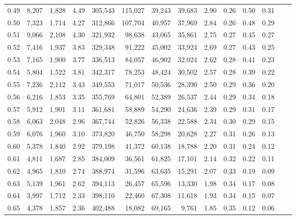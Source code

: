\begin{tabular}{rrrrrrrrrrrrrr}
0.49 &   8,207 &  1,828 &    4.49 &  305,543 &  115,027 &  39,243 &  39,683 &  2.90 &  0.26 &  0.50 &      0.31 \\
0.50 &   7,323 &  1,714 &    4.27 &  312,866 &  107,704 &  40,957 &  37,969 &  2.84 &  0.26 &  0.48 &      0.29 \\
0.51 &   9,066 &  2,108 &    4.30 &  321,932 &   98,638 &  43,065 &  35,861 &  2.75 &  0.27 &  0.45 &      0.27 \\
0.52 &   7,416 &  1,937 &    3.83 &  329,348 &   91,222 &  45,002 &  33,924 &  2.69 &  0.27 &  0.43 &      0.25 \\
0.53 &   7,165 &  1,900 &    3.77 &  336,513 &   84,057 &  46,902 &  32,024 &  2.62 &  0.28 &  0.41 &      0.23 \\
0.54 &   5,804 &  1,522 &    3.81 &  342,317 &   78,253 &  48,424 &  30,502 &  2.57 &  0.28 &  0.39 &      0.22 \\
0.55 &   7,236 &  2,112 &    3.43 &  349,553 &   71,017 &  50,536 &  28,390 &  2.50 &  0.29 &  0.36 &      0.20 \\
0.56 &   6,216 &  1,853 &    3.35 &  355,769 &   64,801 &  52,389 &  26,537 &  2.44 &  0.29 &  0.34 &      0.18 \\
0.57 &   5,912 &  1,901 &    3.11 &  361,681 &   58,889 &  54,290 &  24,636 &  2.39 &  0.29 &  0.31 &      0.17 \\
0.58 &   6,063 &  2,048 &    2.96 &  367,744 &   52,826 &  56,338 &  22,588 &  2.34 &  0.30 &  0.29 &      0.15 \\
0.59 &   6,076 &  1,960 &    3.10 &  373,820 &   46,750 &  58,298 &  20,628 &  2.27 &  0.31 &  0.26 &      0.13 \\
0.60 &   5,378 &  1,840 &    2.92 &  379,198 &   41,372 &  60,138 &  18,788 &  2.20 &  0.31 &  0.24 &      0.12 \\
0.61 &   4,811 &  1,687 &    2.85 &  384,009 &   36,561 &  61,825 &  17,101 &  2.14 &  0.32 &  0.22 &      0.11 \\
0.62 &   4,965 &  1,810 &    2.74 &  388,974 &   31,596 &  63,635 &  15,291 &  2.07 &  0.33 &  0.19 &      0.09 \\
0.63 &   5,139 &  1,961 &    2.62 &  394,113 &   26,457 &  65,596 &  13,330 &  1.98 &  0.34 &  0.17 &      0.08 \\
0.64 &   3,997 &  1,712 &    2.33 &  398,110 &   22,460 &  67,308 &  11,618 &  1.93 &  0.34 &  0.15 &      0.07 \\
0.65 &   4,378 &  1,857 &    2.36 &  402,488 &   18,082 &  69,165 &   9,761 &  1.85 &  0.35 &  0.12 &      0.06 \\

\end{tabular}
